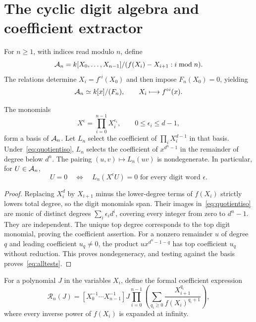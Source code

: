 \section{The cyclic digit algebra and coefficient extractor}\label{sec:extractor}

For $n\ge1$, with indices read modulo $n$, define
\begin{equation}\label{eq:cyclicalgebra}
 \mathcal A_n=k[X_0,\ldots,X_{n-1}]/
       (f(X_i)-X_{i+1}:i\bmod n).
\end{equation}
The relations determine $X_i=f^{\circ i}(X_0)$ and then impose
$F_n(X_0)=0$, yielding
\begin{equation}\label{eq:quotientiso}
 \mathcal A_n\simeq k[x]/(F_n),\qquad X_i\longmapsto f^{\circ i}(x).
\end{equation}

\begin{lemma}\label{lem:basis}
The monomials
\begin{equation}\label{eq:digits}
 X^\epsilon=\prod_{i=0}^{n-1}X_i^{\epsilon_i},\qquad
        0\le\epsilon_i\le d-1,
\end{equation}
form a basis of $\mathcal A_n$. Let $L_n$ select the coefficient of
$\prod_iX_i^{d-1}$ in that basis. Under~\eqref{eq:quotientiso},
$L_n$ selects the coefficient of $x^{d^n-1}$ in the remainder of
degree below $d^n$. The pairing $(u,v)\mapsto L_n(uv)$ is
nondegenerate. In particular, for $U\in\mathcal A_n$,
\begin{equation}\label{eq:alltests}
 U=0\quad\Longleftrightarrow\quad
 L_n(X^\epsilon U)=0\text{ for every digit word }\epsilon.
\end{equation}
\end{lemma}
\begin{proof}
Replacing $X_i^d$ by $X_{i+1}$ minus the lower-degree terms of
$f(X_i)$ strictly lowers total degree, so the digit monomials span.
Their images in~\eqref{eq:quotientiso} are monic of distinct degrees
$\sum_i\epsilon_i d^i$, covering every integer from zero to
$d^n-1$. They are independent. The unique top degree corresponds
to the top digit monomial, proving the coefficient assertion.
For a nonzero remainder $u$ of degree $q$ and leading coefficient
$u_q\ne0$, the product $u x^{d^n-1-q}$ has top coefficient $u_q$
without reduction. This proves nondegeneracy, and testing against
the basis proves~\eqref{eq:alltests}.
\end{proof}

For a polynomial $J$ in the variables $X_i$, define the formal
coefficient expression
\begin{equation}\label{eq:extractor}
 \mathcal R_n(J)=
 [X_0^{-1}\cdots X_{n-1}^{-1}]
 J\prod_{i=0}^{n-1}
 \left(\sum_{q_i\ge0}\frac{X_{i+1}^{q_i}}{f(X_i)^{q_i+1}}\right),
\end{equation}
where every inverse power of $f(X_i)$ is expanded at infinity.


